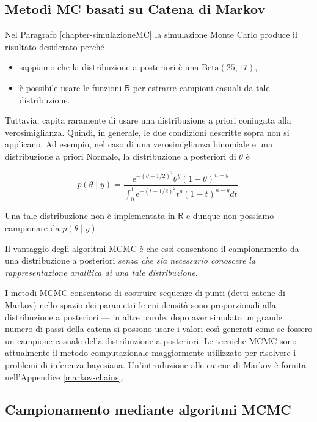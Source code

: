 \documentclass[
  11pt,
]{krantz}
\providecommand{\tightlist}{%
  \setlength{\itemsep}{0pt}\setlength{\parskip}{0pt}}
\newcommand{\R}{\textsf{R}} %
\theoremstyle{definition}
\theoremstyle{definition}
\theoremstyle{definition}
\theoremstyle{definition}
\theoremstyle{remark}
\begin{document}
\hypertarget{metodi-mc-basati-su-catena-di-markov}{%
\subsection{Metodi MC basati su Catena di Markov}\label{metodi-mc-basati-su-catena-di-markov}}

Nel Paragrafo \ref{chapter-simulazioneMC} la simulazione Monte Carlo produce il risultato desiderato perché

\begin{itemize}
\tightlist
\item
  sappiamo che la distribuzione a posteriori è una \(\mbox{Beta}(25, 17)\),
\item
  è possibile usare le funzioni \(\R\) per estrarre campioni casuali da tale distribuzione.
\end{itemize}

Tuttavia, capita raramente di usare una distribuzione a priori coniugata alla verosimiglianza. Quindi, in generale, le due condizioni descritte sopra non si applicano. Ad esempio, nel caso di una verosimiglianza binomiale e una distribuzione a priori Normale, la distribuzione a posteriori di \(\theta\) è

\[
p(\theta \mid y) = \frac{\mathrm{e}^{-(\theta - 1 / 2)^2} \theta^y (1 - \theta)^{n - y}} {\int_0^1 \mathrm{e}^{-(t - 1 / 2)^2} t^y (1 - t)^{n - y} dt}.
\]

Una tale distribuzione non è implementata in \(\R\) e dunque non possiamo campionare da \(p(\theta \mid y)\).

Il vantaggio degli algoritmi MCMC è che essi consentono il campionamento da una distribuzione a posteriori \emph{senza che sia necessario conoscere la rappresentazione analitica di una tale distribuzione}.

I metodi MCMC consentono di costruire sequenze di punti (detti catene di Markov) nello spazio dei parametri le cui densità sono proporzionali alla distribuzione a posteriori --- in altre parole, dopo aver simulato un grande numero di passi della catena si possono usare i valori così generati come se fossero un campione casuale della distribuzione a posteriori. Le tecniche MCMC sono attualmente il metodo computazionale maggiormente utilizzato per risolvere i problemi di inferenza bayesiana. Un'introduzione alle catene di Markov è fornita nell'Appendice \ref{markov-chains}.

\hypertarget{campionamento-mediante-algoritmi-mcmc}{%
\subsection{Campionamento mediante algoritmi MCMC}\label{campionamento-mediante-algoritmi-mcmc}}
\end{document}
